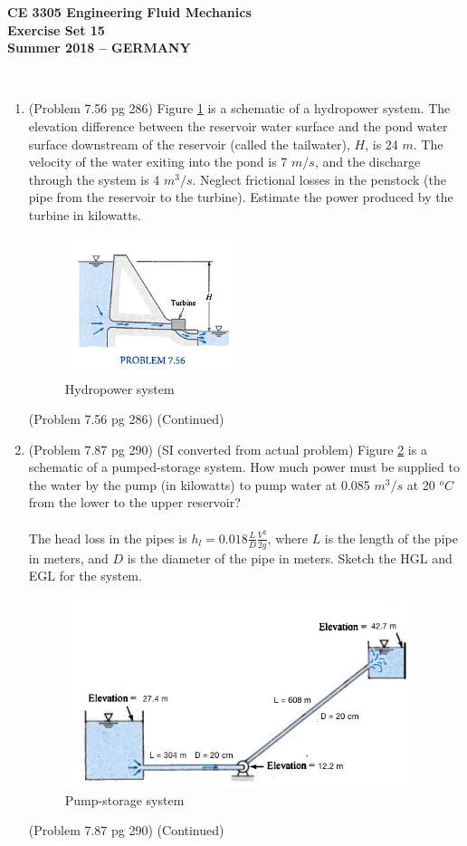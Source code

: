 \documentclass[12pt]{article}
\begin{document}
\begingroup
\begin{center}
{\textbf{{ CE 3305 Engineering Fluid Mechanics} \\ Exercise Set 15 \\ Summer 2018 -- GERMANY} }
\end{center}
\endgroup
\begingroup
~\newline

\begin{enumerate}
\item (Problem 7.56 pg 286)  Figure \ref{fig:Hydropower} is a schematic of a hydropower system.
The elevation difference between the reservoir water surface and the pond water surface downstream of the reservoir (called the tailwater), $H$, is 24 $m$.
The velocity of the water exiting into the pond is 7 $m/s$, and the discharge through the system is 4 $m^3/s$.
Neglect frictional losses in the penstock (the pipe from the reservoir to the turbine).   Estimate the power produced by the turbine in kilowatts.

\begin{figure}[h!] %
   \centering
   \includegraphics[width=2in]{Hydropower.jpg} 
   \caption{Hydropower system}
   \label{fig:Hydropower}
\end{figure}
\clearpage
(Problem 7.56 pg 286)  (Continued)
\clearpage

\item (Problem 7.87 pg 290) (SI converted from actual problem) 
Figure \ref{fig:PumpUphill} is a schematic of a pumped-storage system.
How much power must be supplied to the water by the pump (in kilowatts) to pump water at 0.085 $m^3/s$ at 20 $^oC$ from the lower to the upper reservoir?\\
~\\
The head loss in the pipes is $h_l=0.018\frac{L}{D}\frac{V^2}{2g}$, where $L$ is the length of the pipe in meters, and $D$ is the diameter of the pipe in meters.
Sketch the HGL and EGL for the system.

\begin{figure}[h!] %
   \centering
   \includegraphics[width=4in]{PumpUphill.jpg} 
   \caption{Pump-storage system}
   \label{fig:PumpUphill}
\end{figure}
\clearpage
 (Problem 7.87 pg 290) (Continued)
\end{enumerate}
\end{document}
